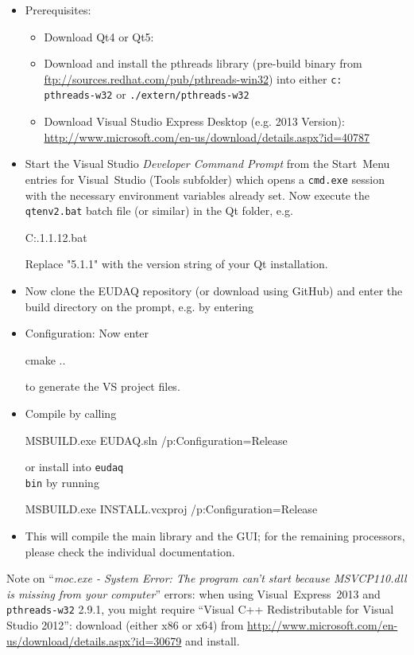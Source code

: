 \begin{itemize}
\item Prerequisites: 
\begin{itemize}
\item Download Qt4 or Qt5:
\item Download and install the pthreads library (pre-build binary from
  \url{ftp://sources.redhat.com/pub/pthreads-win32}) into either
  \texttt{c:\\pthreads-w32} or \texttt{./extern/pthreads-w32}
\item Download Visual Studio Express Desktop (e.g. 2013 Version):
  \url{http://www.microsoft.com/en-us/download/details.aspx?id=40787}
\end{itemize}

\item Start the Visual Studio \emph{Developer Command Prompt} from the
  Start~Menu entries for Visual~Studio (Tools subfolder) which opens a
  \texttt{cmd.exe} session with the necessary environment variables
  already set. Now execute the \texttt{qtenv2.bat} batch file (or similar) in the Qt folder, e.g.
  
  \begin{listing}[mybash]
C:\Qt{}.1\5.1.1\bin\qtenv2.bat
\end{listing}
Replace "5.1.1" with the version string of your Qt installation.

\item Now clone the EUDAQ repository (or download using GitHub) and enter the build directory on the prompt, e.g. by entering

  \begin{listing}[mybash]
cd c:\Users\[username]\Documents\GitHub\eudaq\build
\end{listing}

\item Configuration: Now enter

  \begin{listing}[mybash]
cmake ..
\end{listing}

to generate the VS project files.

\item Compile by calling
  \begin{listing}[mybash]
MSBUILD.exe EUDAQ.sln /p:Configuration=Release
\end{listing}
or install into \texttt{eudaq\\bin} by running
  \begin{listing}[mybash]
MSBUILD.exe INSTALL.vcxproj /p:Configuration=Release
\end{listing}
\item This will compile the main library and the GUI; for the remaining processors, please check the individual documentation.
\end{itemize}

Note on ``\emph{moc.exe - System Error: The program can't start
  because MSVCP110.dll is missing from your computer}'' errors: when using Visual~Express~2013 and \texttt{pthreads-w32} 2.9.1, you might require ``Visual C++ Redistributable for Visual Studio 2012'': download (either x86 or x64) from \url{http://www.microsoft.com/en-us/download/details.aspx?id=30679} and install.
